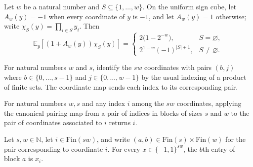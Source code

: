 \begin{theorem}
\label{FABL.expect_one_add_andFunction_mul_monomial}
\leanok
{}
Let $w$ be a natural number and $S\subseteq\{1,\ldots,w\}$. On the uniform sign cube,
let $A_w(y)=-1$ when every coordinate of $y$ is $-1$, and let $A_w(y)=1$ otherwise;
write $\chi_S(y)=\prod_{i\in S}y_i$. Then
\[
\mathbb E_y[(1+A_w(y))\chi_S(y)]=
\begin{cases}
2\bigl(1-2^{-w}\bigr),&S=\varnothing,\\
2^{1-w}(-1)^{|S|+1},&S\ne\varnothing.
\end{cases}
\]
\end{theorem}

\begin{definition}
\label{FABL.tribesCoord}
\leanok
For natural numbers $w$ and $s$, identify the $sw$ coordinates with pairs $(b,j)$ where
$b\in\{0,\ldots,s-1\}$ and $j\in\{0,\ldots,w-1\}$ by the usual indexing of a product of
finite sets. The coordinate map sends each index to its corresponding pair.
\end{definition}

\begin{theorem}
\label{FABL.finProdFinEquiv_tribesCoord}
\leanok
{}
For natural numbers $w,s$ and any index $i$ among the $sw$ coordinates, applying the
canonical pairing map from a pair of indices in blocks of sizes $s$ and $w$ to the pair
of coordinates associated to $i$ returns $i$.
\end{theorem}

\begin{theorem}
\label{FABL.inputBlock_tribesCoord}
\leanok
{}
Let $s,w\in\mathbb N$, let $i\in\mathrm{Fin}(sw)$, and write
$(a,b)\in\mathrm{Fin}(s)\times\mathrm{Fin}(w)$ for the pair corresponding to coordinate
$i$. For every $x\in\{−1,1\}^{sw}$, the $b$th entry of block $a$ is $x_i$.
\end{theorem}

